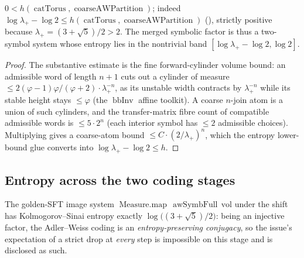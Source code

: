 \begin{theorem}\label{coarseAW_ksEntropyPartition_pos}
  \leanok
  \(0 < h(\operatorname{catTorus}, \operatorname{coarseAWPartition})\); indeed
  \(\log\lambda_+ - \log 2\le h(\operatorname{catTorus}, \operatorname{coarseAWPartition})\)
  (), strictly positive because
  \(\lambda_+ = (3+\sqrt5)/2 > 2\). The merged symbolic factor is thus a two-symbol system whose
  entropy lies in the nontrivial band \([\log\lambda_+ - \log 2, \log 2]\).
\end{theorem}
\begin{proof}\leanok
  The substantive estimate is the fine forward-cylinder volume bound: an admissible word of length
  \(n+1\) cuts out a cylinder of measure \(\le 2(\varphi-1)\varphi/(\varphi+2)\cdot\lambda_+^{-n}\), as
  its unstable width contracts by \(\lambda_+^{-n}\) while its stable height stays \(\le\varphi\)
  (the \(\operatorname{bbInv}\) affine toolkit). A coarse \(n\)-join atom is a union of such cylinders,
  and the transfer-matrix fibre count of compatible admissible words is \(\le 5\cdot 2^n\) (each
  interior symbol has \(\le 2\) admissible choices). Multiplying gives a coarse-atom bound
  \(\le C\cdot(2/\lambda_+)^n\), which the entropy lower-bound glue converts into
  \(\log\lambda_+ - \log 2\le h\).
\end{proof}

\subsection{Entropy across the two coding stages}

\begin{theorem}\label{ksEntropy_mapAwSymbFull_eq}
  \leanok
  The golden-SFT image system \(\operatorname{Measure.map}\,\operatorname{awSymbFull}\,\mathrm{vol}\)
  under the shift has Kolmogorov--Sinai entropy exactly \(\log\!\big((3+\sqrt5)/2\big)\): being an
  injective factor, the Adler--Weiss coding is an \emph{entropy-preserving conjugacy}, so the issue's
  expectation of a strict drop at \emph{every} step is impossible on this stage and is disclosed as
  such.
\end{theorem}

